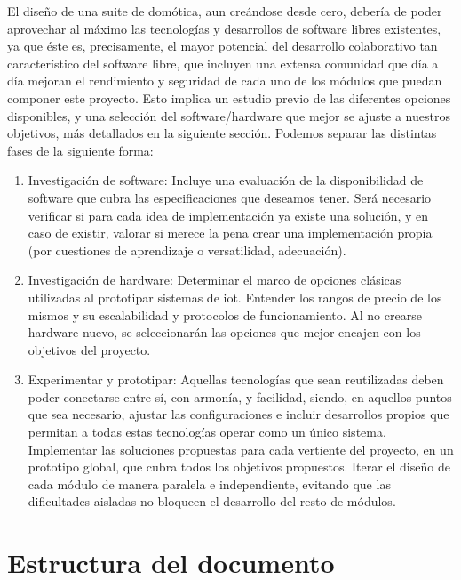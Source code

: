 El diseño de una suite de domótica, aun creándose desde cero, debería de poder aprovechar al máximo las tecnologías y desarrollos de software libres existentes, ya que éste es, precisamente, el mayor potencial del desarrollo colaborativo tan característico del software libre, que incluyen una extensa comunidad que día a día mejoran el rendimiento y seguridad de cada uno de los módulos que puedan componer este proyecto. Esto implica un estudio previo de las diferentes opciones disponibles, y una selección del software/hardware que mejor se ajuste a nuestros objetivos, más detallados en la siguiente sección. Podemos separar las distintas fases de la siguiente forma:

\begin{enumerate}
  \item Investigación de software: Incluye una evaluación de la disponibilidad de software que cubra las especificaciones que deseamos tener. Será necesario verificar si para cada idea de implementación ya existe una solución, y en caso de existir, valorar si merece la pena crear una implementación propia (por cuestiones de aprendizaje o versatilidad, adecuación).

  \item Investigación de hardware: Determinar el marco de opciones clásicas utilizadas al prototipar sistemas de \gls{iot}. Entender los rangos de precio de los mismos y su escalabilidad y protocolos de funcionamiento. Al no crearse hardware nuevo, se seleccionarán las opciones que mejor encajen con los objetivos del proyecto.

  \item Experimentar y prototipar: Aquellas tecnologías que sean reutilizadas deben poder conectarse entre sí, con armonía, y facilidad, siendo, en aquellos puntos que sea necesario, ajustar las configuraciones e incluir desarrollos propios que permitan a todas estas tecnologías operar como un único sistema. Implementar las soluciones propuestas para cada vertiente del proyecto, en un prototipo global, que cubra todos los objetivos propuestos. Iterar el diseño de cada módulo de manera paralela e independiente, evitando que las dificultades aisladas no bloqueen el desarrollo del resto de módulos.

\end{enumerate}

\section{Estructura del documento}
\label{ch:Capitulo1.3}

